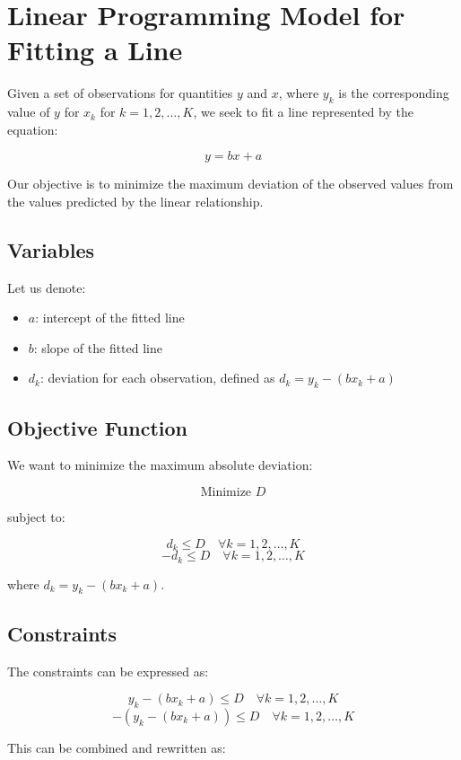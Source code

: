 \documentclass{article}
\begin{document}
\section*{Linear Programming Model for Fitting a Line}

Given a set of observations for quantities \( y \) and \( x \), where \( y_k \) is the corresponding value of \( y \) for \( x_k \) for \( k = 1, 2, \ldots, K \), we seek to fit a line represented by the equation:

\[
y = bx + a
\]

Our objective is to minimize the maximum deviation of the observed values from the values predicted by the linear relationship.

\subsection*{Variables}

Let us denote:
\begin{itemize}
    \item \( a \): intercept of the fitted line
    \item \( b \): slope of the fitted line
    \item \( d_k \): deviation for each observation, defined as \( d_k = y_k - (bx_k + a) \)
\end{itemize}

\subsection*{Objective Function}

We want to minimize the maximum absolute deviation:

\[
\text{Minimize } D
\]

subject to:

\[
d_k \leq D \quad \forall k = 1, 2, \ldots, K
\]
\[
-d_k \leq D \quad \forall k = 1, 2, \ldots, K
\]

where \( d_k = y_k - (bx_k + a) \).

\subsection*{Constraints}

The constraints can be expressed as:

\[
y_k - (bx_k + a) \leq D \quad \forall k = 1, 2, \ldots, K
\]
\[
-(y_k - (bx_k + a)) \leq D \quad \forall k = 1, 2, \ldots, K
\]

This can be combined and rewritten as:
\end{document}
